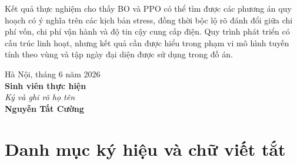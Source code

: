 \documentclass[12pt, a4paper]{report}
\begin{document}
Kết quả thực nghiệm cho thấy BO và PPO có thể tìm được các phương án quy hoạch có ý nghĩa trên các kịch bản stress, đồng thời bộc lộ rõ đánh đổi giữa chi phí vốn, chi phí vận hành và độ tin cậy cung cấp điện. Quy trình phát triển có cấu trúc linh hoạt, nhưng kết quả cần được hiểu trong phạm vi mô hình tuyến tính theo vùng và tập ngày đại diện được sử dụng trong đồ án.

\vfill
\begin{flushright}
  \begin{minipage}{0.45\linewidth}
    \centering
    Hà Nội, tháng 6 năm 2026\\[8pt]
    \textbf{Sinh viên thực hiện}\\[4pt]
    \textit{Ký và ghi rõ họ tên}\\[60pt]
    \textbf{Nguyễn Tất Cường}
  \end{minipage}
\end{flushright}

\newpage
\tableofcontents

\newpage
\listoffigures
{}

\newpage
\listoftables
{}

\newpage
\chapter*{Danh mục ký hiệu và chữ viết tắt}
\end{document}
